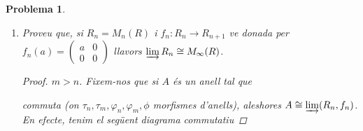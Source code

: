 \documentclass[compress]{article}
\newtheorem{problema}{Problema}
\theoremstyle{definition}
\begin{document}
\begin{problema}
\begin{enumerate}
\begin{proof}
            \begin{align*}
                \psi([(r,n)])\star_{S}\psi([(s,m)])
                &=\varphi_{n}(r)\star_{S}\varphi_{m}(s)
                &\quad&\textrm{(Per definició de $\psi$)}\\
                &=\varphi_{k}(f_{nk}(r))
                \star_{S}\varphi_{k}(f_{mk}(s))
                &\quad&\textrm{($k\geq n,m$: $\varphi_{n}=\varphi_{k}\circ f_{nk},\varphi_{m}=\varphi_{k}\circ f_{mk}$)}\\
                &=\varphi_{k}(f_{nk}(r)
                \star_{_{R_{k}}}f_{mk}(s))
                &\quad&\textrm{($\varphi_{k}$ morfisme d'anells)}\\
                &=\psi([(f_{nk}(r)
                \star_{_{R_{k}}}f_{mk}(s),k)])
                &\quad&\textrm{(Per definició de $\psi$)}\\
                &=\psi([(r',n')]\star[(s,m)])
                &\quad&\textrm{(Per definició de $\star$)}
            \end{align*}
            A més, $\psi$ esta unívocament determinada i $\psi(\mu_{n}(r))=\psi([(r,n)])=\varphi_{n}(r)$ per definició de $\mu_{n}$ i $\psi$, d'on resulta l'enunciat.
        \end{proof}
        \item Proveu que, si $R_{n}=M_{n}(R)$ i $f_{n}:R_{n}\rightarrow R_{n+1}$ ve donada per $f_{n}(a)=\left(\begin{smallmatrix}a&0\\0&0\end{smallmatrix}\right)$ llavors $\varinjlim R_{n}\cong M_{\infty}(R)$.
        \begin{proof}
            $m>n$. Fixem-nos que si $A$ és un anell tal que
            \begin{center}
            \end{center}
            commuta (on $\tau_{n},\tau_{m},\varphi_{n},\varphi_{m},\phi$ morfismes d'anells), aleshores $A\cong\varinjlim(R_{n},f_{n})$. En efecte, tenim el següent diagrama commutatiu

\end{proof}
\end{enumerate}
\end{problema}
\end{document}
